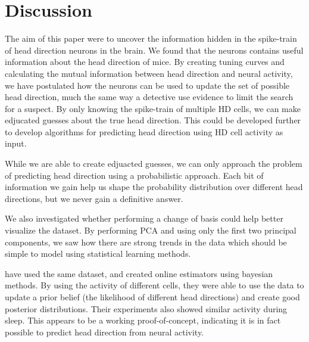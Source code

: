 \section{Discussion}
The aim of this paper were to uncover the information hidden in the spike-train of head direction neurons in the brain.
We found that the neurons contains useful information about the head direction of mice. By creating tuning curves and calculating the mutual information between head direction and neural activity, we have postulated how the neurons can be used to update the set of possible head direction, much the same way a detective use evidence to limit the search for a suspect. By only knowing the spike-train of multiple HD cells, we can make edjucated guesses about the true head direction. This could be developed further to develop algorithms for predicting head direction using HD cell activity as input. 

While we are able to create edjuacted guesses, we can only approach the problem of predicting head direction using a probabilistic approach. Each bit of information we gain help us shape the probability distribution over different head directions, but we never gain a definitive answer. 

We also investigated whether performing a change of basis could help better visualize the dataset. By performing PCA and using only the first two principal components, we saw how there are strong trends in the data which should be simple to model using statistical learning methods.



\cite{projectdata} have used the same dataset, and created online estimators using bayesian methods. By using the activity of different cells, they were able to use the data to update a prior belief (the likelihood of different head directions) and create good posterior distributions. Their experiments also showed similar activity during sleep. This appears to be a working proof-of-concept, indicating it is in fact possible to predict head direction from neural activity.

